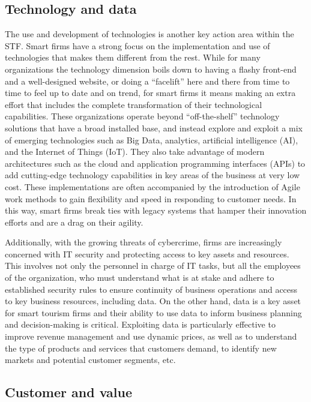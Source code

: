 \documentclass[
  letterpaper,
  DIV=11,
  numbers=noendperiod]{scrreprt}
\begin{document}
\hypertarget{technology-and-data}{%
\subsection{Technology and data}\label{technology-and-data}}

The use and development of technologies is another key action area
within the STF. Smart firms have a strong focus on the implementation
and use of technologies that makes them different from the rest. While
for many organizations the technology dimension boils down to having a
flashy front-end and a well-designed website, or doing a ``facelift''
here and there from time to time to feel up to date and on trend, for
smart firms it means making an extra effort that includes the complete
transformation of their technological capabilities. These organizations
operate beyond ``off-the-shelf'' technology solutions that have a broad
installed base, and instead explore and exploit a mix of emerging
technologies such as Big Data, analytics, artificial intelligence (AI),
and the Internet of Things (IoT). They also take advantage of modern
architectures such as the cloud and application programming interfaces
(APIs) to add cutting-edge technology capabilities in key areas of the
business at very low cost. These implementations are often accompanied
by the introduction of Agile work methods to gain flexibility and speed
in responding to customer needs. In this way, smart firms break ties
with legacy systems that hamper their innovation efforts and are a drag
on their agility.

Additionally, with the growing threats of cybercrime, firms are
increasingly concerned with IT security and protecting access to key
assets and resources. This involves not only the personnel in charge of
IT tasks, but all the employees of the organization, who must understand
what is at stake and adhere to established security rules to ensure
continuity of business operations and access to key business resources,
including data. On the other hand, data is a key asset for smart tourism
firms and their ability to use data to inform business planning and
decision-making is critical. Exploiting data is particularly effective
to improve revenue management and use dynamic prices, as well as to
understand the type of products and services that customers demand, to
identify new markets and potential customer segments, etc.

\hypertarget{customer-and-value}{%
\subsection{Customer and value}\label{customer-and-value}}
\end{document}

